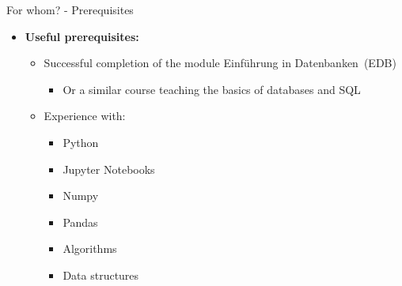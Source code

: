 \begin{frame}{For whom? - Prerequisites}
	\begin{itemize}
		\item \textbf{Useful prerequisites:}
		      \begin{itemize}
			      \item Successful completion of the module \glqq Einführung in Datenbanken\grqq~(EDB)
			            \begin{itemize}
				            \item Or a similar course teaching the basics of databases and SQL
			            \end{itemize}
			      \item Experience with:
			            \begin{itemize}
				            \item Python
				            \item Jupyter Notebooks
				            \item Numpy
				            \item Pandas
				            \item Algorithms
				            \item Data structures
			            \end{itemize}
		      \end{itemize}
	\end{itemize}

\end{frame}


